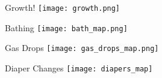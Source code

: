 \begin{frame}{Growth!}
\centering
\texttt{[image: growth.png]}
\end{frame}

\begin{frame}{Bathing}
\centering
\texttt{[image: bath\_map.png]}
\end{frame}

\begin{frame}{Gas Drops}
\centering
\texttt{[image: gas\_drops\_map.png]}
\end{frame}

\begin{frame}{Diaper Changes}
\centering
\texttt{[image: diapers\_map]}
\end{frame}

